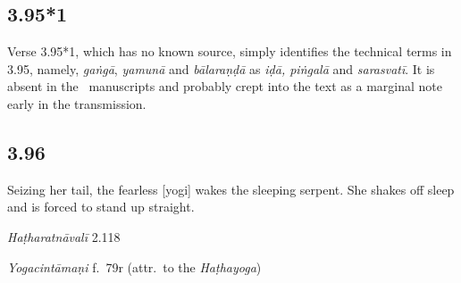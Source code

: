 \begin{ekdosis}
\begin{philcomm}[hp03_095]
\end{philcomm}

\subsection*{3.95*1}

\begin{philcomm}[hp03_095_1]
Verse 3.95*1, which has no known source, simply identifies the technical terms in 3.95, namely, \emph{gaṅgā}, \emph{yamunā} and \emph{bālaraṇḍā} as \emph{iḍā, piṅgalā} and \emph{sarasvatī}. It is absent in the \textalpha\ manuscripts and probably crept into the text as a marginal note early in the transmission.     
\end{philcomm}

\subsection*{3.96}
\begin{translation}[hp03_096]
Seizing her tail, the fearless [yogi] wakes the sleeping serpent. She shakes off sleep and is forced to stand up straight.
\end{translation}


\begin{testimonia}[hp03_096]
\emph{Haṭharatnāvalī} 2.118
\begin{versinnote}
\end{versinnote}

\emph{Yogacintāmaṇi} f.~79r (attr.~to the \emph{Haṭhayoga})
\begin{versinnote}
\end{versinnote}


\end{testimonia}
\end{ekdosis}
